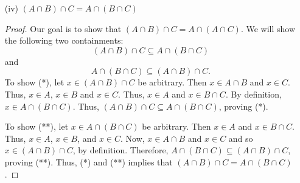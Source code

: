 \documentclass[a4paper]{article}
\begin{document}
\begin{enumerate}
\begin{proof}
        To show (**), let \( x \in (A \cup B) \cup C  \) be arbitrary. Then either \( x \in A \cup B \), \( x \in C  \) or both. If \( x \in A \cup B \), then either \( x \in A    \) or \( x \in B \) or both. If \( x \in A  \), then \( x \in A \cup (B \cup C ) \) since \( A  \) is contained in the union \( A \cup (B \cup C ) \). If \( x \in B \), then \( x \in B \cup C  \) since \( B  \) is contained in the union \( B \cup C  \). Since \( B \cup C  \) is contained in the union \( A \cup (B \cup C )  \), \( x \in A \cup (B \cup C) \). Now, if \( x \in C  \), then \( x \in B \cup C  \). By definition, this tells us that \( x \in A \cup (B \cup C ) \) by the same reasoning as before. If \( x  \) is in both, then we have \( x \in A \cup (B \cup C ) \) (since it is in all of them and we only require \( x  \) to be in one of them at least). Thus, we have \( (A \cup B) \cup C \subseteq A \cup (B \cup C ) \).
        \end{proof}
    
    \item[(iv)] \( (A \cap B) \cap C  = A \cap (B \cap C) \)
        \begin{proof}
        Our goal is to show that \( (A \cap B) \cap C  = A \cap (A \cap C) \). We will show the following two containments:
        \[  (A \cap B) \cap C \subseteq  A \cap (B \cap C) \tag{*} \]
        and
        \[  A \cap (B \cap C) \subseteq  (A \cap B) \cap C.  \tag{**} \]
        To show (*), let \( x \in (A \cap B) \cap C  \) be arbitrary. Then \( x \in A \cap B \) and \( x \in C  \). Thus, \( x \in A  \), \( x \in B  \) and \( x \in C  \). Thus, \( x \in A  \) and \( x \in B \cap C  \). By definition, \( x \in A \cap (B \cap C) \). Thus, \( (A \cap B) \cap C \subseteq A \cap (B \cap C) \), proving (*).

        To show (**), let \( x \in A \cap (B \cap C)  \) be arbitrary. Then \( x \in A  \) and \( x \in B \cap C \). Thus, \( x \in A  \), \( x \in B  \), and \( x \in C  \). Now, \( x \in A \cap B  \) and \( x \in C  \) and so \( x \in (A \cap B) \cap C  \), by definition. Therefore, \( A \cap (B \cap C) \subseteq  (A \cap B) \cap C  \), proving (**). Thus, (*) and (**) implies that \( (A \cap B) \cap C = A \cap (B \cap C) \).
       


\end{proof}
\end{enumerate}
\end{document}
